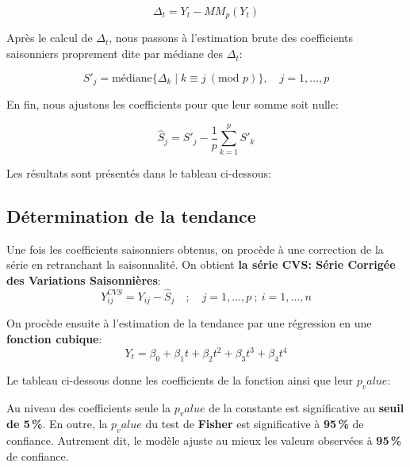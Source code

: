 \documentclass[
12pt,          %
a4paper,       %
oneside,       %
openright      %
]{report}
\begin{document}
 \[
 \Delta_t = Y_t - MM_p(Y_t)
 \]
 
 Après le calcul de $\Delta_t$, nous passons à l'estimation brute des coefficients saisonniers proprement dite par médiane des  $\Delta_t$:
 
 \[
 S'_j = \text{médiane}\{\Delta_k \mid k \equiv j \ (\text{mod } p)\}, \quad j = 1, \ldots, p
 \]
 
 
 En fin, nous ajustons les  coefficients pour que leur somme soit nulle:
 
 \[
 \hat{S}_j = S'_j - \frac{1}{p} \sum_{k=1}^{p} S'_k
 \]
 
 Les résultats sont présentés dans le tableau ci-dessous: 
 
 
 \begin{table}[H]
 	\centering
 	
 	\caption{Les coefficients saisonniers}
 	\label{tab:coeff_saisonniers_decomposition}
 \end{table}
 
 
 \subsection{ Détermination de la tendance}
 
 Une fois les coefficients saisonniers obtenus, on procède à une correction de la série en retranchant la saisonnalité. On obtient \textbf{la série CVS: Série Corrigée des Variations Saisonnières}:
 \[
 Y_{ij}^{CVS} = Y_{ij} - \hat{S}_j \quad ; \quad j = 1, \ldots, p \ ; \ i = 1, \ldots, n
 \]
 
 On procède ensuite à l’estimation de la tendance par une régression en une \textbf{fonction cubique}:
 \[
 Y_t = \beta_0 + \beta_1 t + \beta_2 t^2 + \beta_3 t^3 + \beta_4 t^4
 \]
 
 
 Le tableau ci-dessous donne les coefficients de la fonction ainsi que leur \textbf{$p_value$}:
 
 \begin{table}[H]
 	\centering
 	
 	\caption{Significativité du modèle polynomial}
 	\label{tab:resultats_modele_polynomial}
 \end{table}
 
 Au niveau des coefficients seule la \textbf{$p_value$} de la constante est significative
  au \textbf{seuil de 5\,\%}. En outre, la \textbf{$p_value$} du test de \textbf{Fisher} est significative à  \textbf{ 95\,\%} de confiance. Autrement dit, le modèle ajuste au mieux les valeurs observées à \textbf{ 95\,\%} de confiance.
 
\end{document}
